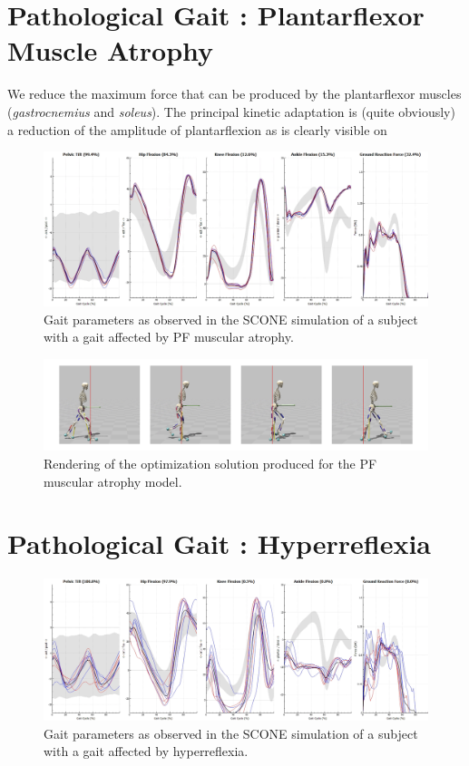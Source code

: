 \documentclass[11pt]{article}
\begin{document}
\section{Pathological Gait : Plantarflexor Muscle Atrophy}

We reduce the maximum force that can be produced by the plantarflexor muscles (\textit{gastrocnemius} and \textit{soleus}). The principal kinetic adaptation is (quite obviously) a reduction of the amplitude of plantarflexion as is clearly visible on 

\begin{figure}[h!]
    \centering
    \includegraphics[width=\textwidth]{screens/atrophy_gait.png}
    \caption{Gait parameters as observed in the SCONE simulation of a subject with a gait affected by PF muscular atrophy.}
    \label{atrophic_gait}
\end{figure}

\begin{figure}[h!]
    \centering
    \includegraphics[width=\textwidth]{screens/heel_walk.jpg}
    \caption{Rendering of the optimization solution produced for the PF muscular atrophy model.}
\end{figure}

\section{Pathological Gait : Hyperreflexia}

\begin{figure}[h!]
    \centering
    \includegraphics[width=\textwidth]{screens/hyperreflexia_gait.png}
    \caption{Gait parameters as observed in the SCONE simulation of a subject with a gait affected by hyperreflexia.}
\end{figure}
\end{document}
